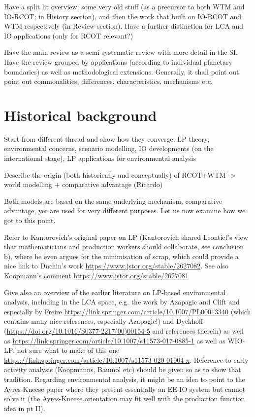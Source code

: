 \documentclass{article}
\begin{document}
\begin{refsection}
Have a split lit overview: some very old stuff (as a precursor to both WTM and IO-RCOT; in History section), and then the work that built on IO-RCOT and WTM respectively (in Review section). Have a further distinction for LCA and IO applications (only for RCOT relevant?)

Have the main review as a semi-systematic review with more detail in the SI. Have the review grouped by applications (according to individual planetary boundaries) as well as methodological extensions. Generally, it shall point out point out commonalities, differences, characteristics, mechanisms etc.


\section{Historical background}

Start from different thread and show how they converge: LP theory, environmental concerns, scenario modelling, IO developments (on the international stage), LP applications for environmental analysis

Describe the origin (both historically and conceptually) of RCOT+WTM -> world modelling + comparative advantage (Ricardo)

Both models are based on the same underlying mechanism, comparative advantage, yet are used for very different purposes. Let us now examine how we got to this point.

Refer to Kantorovich's original paper on LP (Kantorovich shared Leontief's view that mathematicians and production workers should collaborate, see conclusion b), where he even argues for the minimisation of scrap, which could provide a nice link to Duchin's work \url{https://www.jstor.org/stable/2627082}. See also Koopmann's comment \url{https://www.jstor.org/stable/2627081}

Give also an overview of the earlier literature on LP-based environmental analysis, including in the LCA space, e.g. the work by Azapagic and Clift and especially by Freire \url{https://link.springer.com/article/10.1007/PL00013340} (which contains many nice references, especially Azapagic!) and Dyckhoff (\url{https://doi.org/10.1016/S0377-2217(00)00154-5} and references therein) as well as \url{https://link.springer.com/article/10.1007/s11573-017-0885-1} as well as WIO-LP; not sure what to make of this one \url{https://link.springer.com/article/10.1007/s11573-020-01004-x}. Reference to early activity analysis (Koopmanns, Baumol etc) should be given so as to show that tradition. Regarding environmental analysis, it might be an idea to point to the Ayres-Kneese paper where they present essentially an EE-IO system but cannot solve it (the Ayres-Kneese orientation may fit well with the production function idea in pt II).


\end{refsection}
\end{document}
